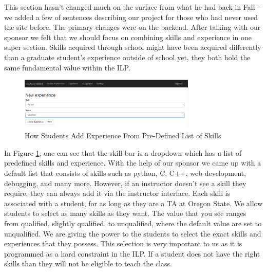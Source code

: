 
This section hasn't changed much on the surface from what he had back in Fall - we added a few of sentences describing our project for those who had never used the site before.
The primary changes were on the backend.
After talking with our sponsor we felt that we should focus on combining skills and experience in one super section.
Skills acquired through school might have been acquired differently than a graduate student's experience outside of school yet, they both hold the same fundamental value within the ILP.

\begin{figure}[!htb]
   \centering
   \includegraphics[width=0.75\textwidth]{images/student-new-experience-beta.png}
   \caption{How Students Add Experience From Pre-Defined List of Skills}\label{student-new-experience-beta}
\end{figure}

In Figure \ref{student-new-experience-beta}, one can see that the skill bar is a dropdown which has a list of predefined skills and experience.
With the help of our sponsor we came up with a default list that consists of skills such as python, C, C++, web development, debugging, and many more.
However, if an instructor doesn't see a skill they require, they can always add it via the instructor interface.
Each skill is associated with a student, for as long as they are a TA at Oregon State.
We allow students to select as many skills as they want.
The value that you see ranges from qualified, slightly qualified, to unqualified, where the default value are set to unqualified.
We are giving the power to the students to select the exact skills and experiences that they possess.
This selection is very important to us as it is programmed as a hard constraint in the ILP.
If a student does not have the right skills than they will not be eligible to teach the class.


